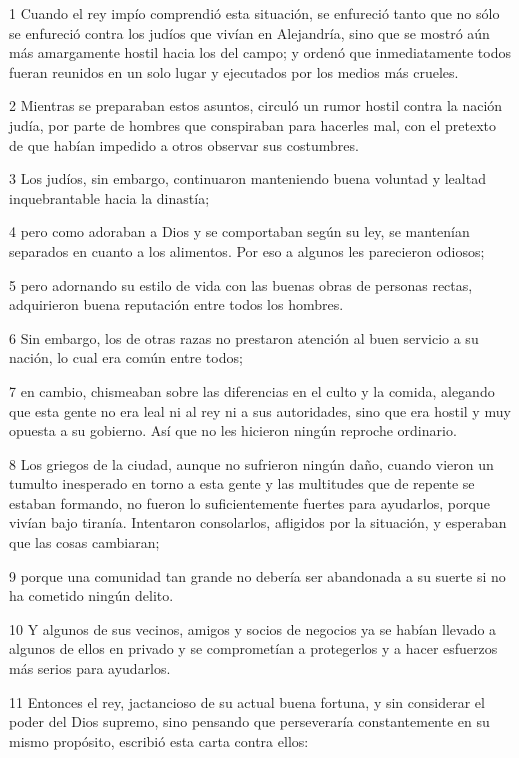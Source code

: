 \par 1 Cuando el rey impío comprendió esta situación, se enfureció tanto que no sólo se enfureció contra los judíos que vivían en Alejandría, sino que se mostró aún más amargamente hostil hacia los del campo; y ordenó que inmediatamente todos fueran reunidos en un solo lugar y ejecutados por los medios más crueles.
\par 2 Mientras se preparaban estos asuntos, circuló un rumor hostil contra la nación judía, por parte de hombres que conspiraban para hacerles mal, con el pretexto de que habían impedido a otros observar sus costumbres.
\par 3 Los judíos, sin embargo, continuaron manteniendo buena voluntad y lealtad inquebrantable hacia la dinastía;
\par 4 pero como adoraban a Dios y se comportaban según su ley, se mantenían separados en cuanto a los alimentos. Por eso a algunos les parecieron odiosos;
\par 5 pero adornando su estilo de vida con las buenas obras de personas rectas, adquirieron buena reputación entre todos los hombres.
\par 6 Sin embargo, los de otras razas no prestaron atención al buen servicio a su nación, lo cual era común entre todos;
\par 7 en cambio, chismeaban sobre las diferencias en el culto y la comida, alegando que esta gente no era leal ni al rey ni a sus autoridades, sino que era hostil y muy opuesta a su gobierno. Así que no les hicieron ningún reproche ordinario.
\par 8 Los griegos de la ciudad, aunque no sufrieron ningún daño, cuando vieron un tumulto inesperado en torno a esta gente y las multitudes que de repente se estaban formando, no fueron lo suficientemente fuertes para ayudarlos, porque vivían bajo tiranía. Intentaron consolarlos, afligidos por la situación, y esperaban que las cosas cambiaran;
\par 9 porque una comunidad tan grande no debería ser abandonada a su suerte si no ha cometido ningún delito.
\par 10 Y algunos de sus vecinos, amigos y socios de negocios ya se habían llevado a algunos de ellos en privado y se comprometían a protegerlos y a hacer esfuerzos más serios para ayudarlos.
\par 11 Entonces el rey, jactancioso de su actual buena fortuna, y sin considerar el poder del Dios supremo, sino pensando que perseveraría constantemente en su mismo propósito, escribió esta carta contra ellos:
